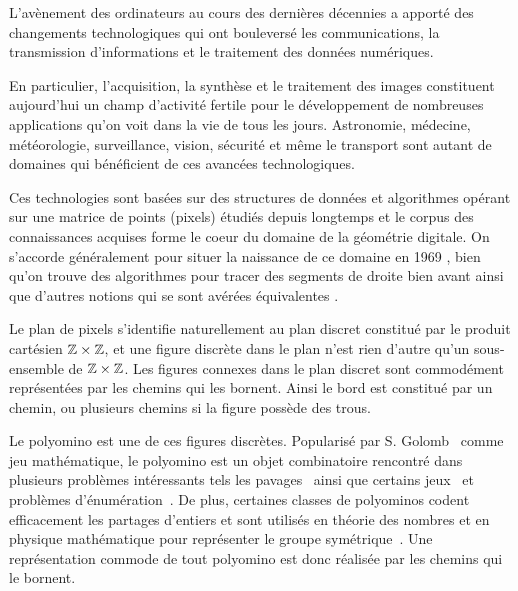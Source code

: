 \begin{introduction}

L'avènement des ordinateurs au cours des dernières décennies a apporté des changements technologiques qui ont bouleversé les communications, la transmission d'informations et le traitement des données numériques. 

En particulier, l'acquisition, la synthèse et le traitement des images constituent  aujourd'hui un champ d'activité fertile pour le développement de nombreuses applications qu'on voit dans la vie de tous les jours. Astronomie, médecine, météorologie, surveillance, vision, sécurité et même le transport sont autant de domaines qui bénéficient de ces avancées technologiques. 

Ces technologies sont basées sur des structures de données et algorithmes opérant sur une matrice de points (pixels) étudiés depuis longtemps et le corpus des connaissances acquises forme le coeur du domaine de la géométrie digitale. On s'accorde généralement pour situer la naissance de ce domaine en 1969 \cite{Rosenfeld69}, bien qu'on trouve des algorithmes pour tracer des segments de droite bien avant \cite{Bresenham65} ainsi que d'autres notions qui se sont avérées équivalentes \cite{Chrl1875}. 

Le plan de pixels s'identifie naturellement au plan discret constitué par le produit cartésien $\mathbb{Z}\times\mathbb{Z}$, et une figure discrète dans le plan n'est rien d'autre qu'un sous-ensemble de $\mathbb{Z}\times\mathbb{Z}$. Les figures connexes dans le plan discret sont commodément représentées par les chemins qui les bornent. Ainsi le bord est constitué par un chemin, ou plusieurs chemins si la figure possède des trous.

Le polyomino est une de ces figures discrètes. Popularisé par S. Golomb~\cite{dbintr39} comme jeu mathématique, le polyomino est un objet combinatoire rencontré dans plusieurs problèmes intéressants tels les pavages~\cite{BN, Golomb} ainsi que certains jeux~\cite{Ga} et problèmes d'énumération~\cite{Jen, JenGutt}. De plus, certaines classes de polyominos codent efficacement les partages d'entiers et sont utilisés en théorie des nombres et en physique mathématique pour représenter le groupe symétrique~\cite{fulton97}. Une représentation commode de tout polyomino est donc réalisée par les chemins qui le bornent.






\end{introduction}
